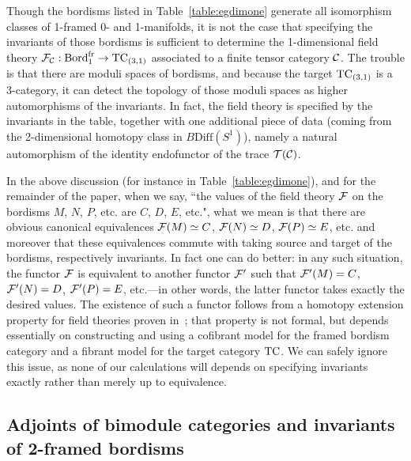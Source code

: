 \documentclass{amsart}
\begin{document}
\begin{remark}
Though the bordisms listed in Table~\ref{table:egdimone} generate all isomorphism classes of 1-framed 0- and 1-manifolds, it is not the case that specifying the invariants of those bordisms is sufficient to determine the 1-dimensional field theory $\mathcal F_\mathcal C : \mathrm{Bord}^\mathrm{fr}_1 \rightarrow \mathrm{TC}_{(3,1)}$ associated to a finite tensor category $\mathcal C$.  The trouble is that there are moduli spaces of bordisms, and because the target $\mathrm{TC}_{(3,1)}$ is a 3-category, it can detect the topology of those moduli spaces as higher automorphisms of the invariants.  In fact, the field theory is specified by the invariants in the table, together with one additional piece of data (coming from the 2-dimensional homotopy class in $B\mathrm{Diff}(S^1)$), namely a natural automorphism of the identity endofunctor of the trace $\mathcal T(\mathcal C)$.
\end{remark}

\begin{remark} \label{rem:hep}
In the above discussion (for instance in Table~\ref{table:egdimone}), and for the remainder of the paper, when we say, ``the values of the field theory $\mathcal F$ on the bordisms $M$, $N$, $P$, etc. are $C$, $D$, $E$, etc.", what we mean is that there are obvious canonical equivalences $\mathcal F(M) \simeq C$, $\mathcal F(N) \simeq D$, $\mathcal F(P) \simeq E$, etc. and moreover that these equivalences commute with taking source and target of the bordisms, respectively invariants.  In fact one can do better: in any such situation, the functor $\mathcal F$ is equivalent to another functor $\mathcal F'$ such that $\mathcal F'(M) = C$, $\mathcal F'(N) = D$, $\mathcal F'(P) = E$, etc.---in other words, the latter functor takes exactly the desired values.  The existence of such a functor follows from a homotopy extension property for field theories proven in~\cite{3TC}; that property is not formal, but depends essentially on constructing and using a cofibrant model for the framed bordism category and a fibrant model for the target category $\mathrm{TC}$.  We can safely ignore this issue, as none of our calculations will depends on specifying invariants exactly rather than merely up to equivalence.
\end{remark}


\subsection{Adjoints of bimodule categories and invariants of 2-framed bordisms}   \label{sec:df-morphisms}
\end{document}

